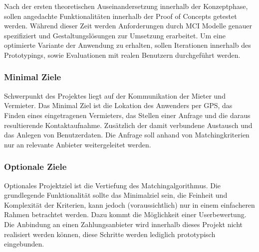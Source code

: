 Nach der ersten theoretischen Auseinandersetzung innerhalb der Konzeptphase, sollen angedachte Funktionalitäten innerhalb der Proof of Concepts getestet werden. Während dieser Zeit werden Anforderungen durch MCI Modelle genauer spezifiziert und Gestaltungslösungen zur Umsetzung erarbeitet. Um eine optimierte Variante der Anwendung zu erhalten, sollen Iterationen innerhalb des Prototypings, sowie Evaluationen mit realen Benutzern durchgeführt werden. 


\subsubsection{Minimal Ziele}
Schwerpunkt des Projektes liegt auf der Kommunikation der Mieter und Vermieter. Das Minimal Ziel ist die Lokation des Anwenders per GPS, das Finden eines eingetragenen Vermieters, das Stellen einer Anfrage und die daraus resultierende Kontaktaufnahme. Zusätzlich der damit verbundene Austausch und das Anlegen von Benutzerdaten. Die Anfrage soll anhand von Matchingkriterien nur an relevante Anbieter weitergeleitet werden.

\subsubsection{Optionale Ziele}
Optionales Projektziel ist die Vertiefung des Matchingalgorithmus. Die grundlegende Funktionalität sollte das Minimalziel sein, die Feinheit und Komplexität der Kriterien, kann jedoch (voraussichtlich) nur in einem einfacheren Rahmen betrachtet werden.
Dazu kommt die Möglichkeit einer Userbewertung. Die Anbindung an einen Zahlungsanbieter wird innerhalb dieses Projekt nicht realisiert werden können, diese Schritte werden lediglich prototypisch eingebunden.
